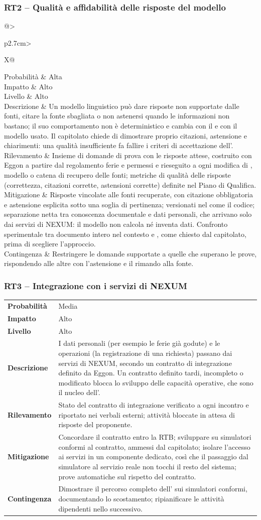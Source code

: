\documentclass[documento]{gpt}
\makeatletter
\newcommand{\rischio}[9]{%
  \subsubsection{#1 -- #2}\label{rischio:#1}
  \noindent
  \begin{tabularx}{\linewidth}{@{}>{\raggedright\arraybackslash\bfseries}p{2.7cm}>{\raggedright\arraybackslash}X@{}}
    \toprule
    Probabilità & #3 \\
    Impatto     & #4 \\
    Livello     & #5 \\
    \midrule
    Descrizione & #6 \\
    \addlinespace
    Rilevamento & #7 \\
    \addlinespace
    Mitigazione & #8 \\
    \addlinespace
    Contingenza & #9 \\
    \bottomrule
  \end{tabularx}
  \medskip
}
\makeatother
\begin{document}
\rischio{RT2}{Qualità e affidabilità delle risposte del modello}{Alta}{Alto}{Alto}
{Un modello linguistico può dare risposte non supportate dalle fonti,
 citare la fonte sbagliata o non astenersi quando le informazioni non
 bastano; il suo comportamento non è deterministico e cambia con il
 \glo[Prompt]{\textit{prompt}} e con il modello usato. Il capitolato chiede di dimostrare
 proprio citazioni, astensione e chiarimenti: una qualità insufficiente fa
 fallire i criteri di accettazione dell'\glo{MVP}.}
{Insieme di domande di prova con le risposte attese, costruito con Eggon a
 partire dal regolamento ferie e permessi e rieseguito a ogni modifica di
 \glo[Prompt]{\textit{prompt}}, modello o catena di recupero delle fonti; metriche di
 qualità delle risposte (correttezza, citazioni corrette, astensioni
 corrette) definite nel Piano di Qualifica.}
{Risposte vincolate alle fonti recuperate, con citazione obbligatoria e
 astensione esplicita sotto una soglia di pertinenza; \glo[Prompt]{\textit{prompt}}
 versionati nel \glo{repository} come il codice; separazione netta tra
 conoscenza documentale e dati personali, che arrivano solo dai servizi
 di NEXUM: il modello non calcola né inventa dati. Confronto
 sperimentale tra documento intero nel contesto e \glo{RAG}, come chiesto
 dal capitolato, prima di scegliere l'approccio.}
{Restringere le domande supportate a quelle che superano le prove,
 rispondendo alle altre con l'astensione e il rimando alla fonte.}

\rischio{RT3}{Integrazione con i servizi di NEXUM}{Media}{Alto}{Alto}
{I dati personali (per esempio le ferie già godute) e le operazioni (la
 registrazione di una richiesta) passano dai servizi di NEXUM, secondo un
 contratto di integrazione definito da Eggon. Un contratto definito tardi,
 incompleto o modificato blocca lo sviluppo delle capacità operative, che
 sono il nucleo dell'\glo{MVP}.}
{Stato del contratto di integrazione verificato a ogni incontro e
 riportato nei verbali esterni; attività bloccate in attesa di risposte
 del proponente.}
{Concordare il contratto entro la RTB; sviluppare su simulatori conformi
 al contratto, ammessi dal capitolato; isolare l'accesso ai servizi in un
 componente dedicato, così che il passaggio dal simulatore al servizio
 reale non tocchi il resto del sistema; prove automatiche sul rispetto del
 contratto.}
{Dimostrare il percorso completo dell'\glo{MVP} sui simulatori conformi,
 documentando lo scostamento; ripianificare le attività dipendenti nello
 \glo[Sprint]{\textit{sprint}} successivo.}
\end{document}
